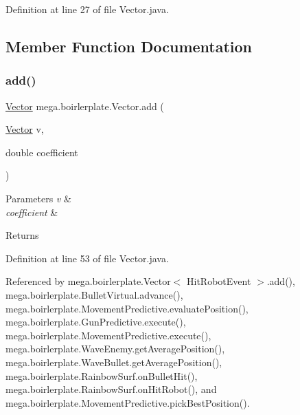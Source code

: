 Definition at line 27 of file Vector.\+java.



\subsection{Member Function Documentation}
\mbox{\label{classmega_1_1boirlerplate_1_1_vector_a475cc51e8bcbbd9b047ec16c351344e2}} 
\subsubsection{\texorpdfstring{add()}{add()}\hspace{0.1cm}{\footnotesize\ttfamily [1/2]}}
{\footnotesize\ttfamily \hyperlink{classmega_1_1boirlerplate_1_1_vector}{Vector} mega.\+boirlerplate.\+Vector.\+add (\begin{DoxyParamCaption}\item[{\hyperlink{classmega_1_1boirlerplate_1_1_vector}{Vector}}]{v,  }\item[{double}]{coefficient }\end{DoxyParamCaption})}


\begin{DoxyParams}{Parameters}
{\em v} & \\
\hline
{\em coefficient} & \\
\hline
\end{DoxyParams}
\begin{DoxyReturn}{Returns}

\end{DoxyReturn}


Definition at line 53 of file Vector.\+java.



Referenced by mega.\+boirlerplate.\+Vector$<$ Hit\+Robot\+Event $>$.\+add(), mega.\+boirlerplate.\+Bullet\+Virtual.\+advance(), mega.\+boirlerplate.\+Movement\+Predictive.\+evaluate\+Position(), mega.\+boirlerplate.\+Gun\+Predictive.\+execute(), mega.\+boirlerplate.\+Movement\+Predictive.\+execute(), mega.\+boirlerplate.\+Wave\+Enemy.\+get\+Average\+Position(), mega.\+boirlerplate.\+Wave\+Bullet.\+get\+Average\+Position(), mega.\+boirlerplate.\+Rainbow\+Surf.\+on\+Bullet\+Hit(), mega.\+boirlerplate.\+Rainbow\+Surf.\+on\+Hit\+Robot(), and mega.\+boirlerplate.\+Movement\+Predictive.\+pick\+Best\+Position().

